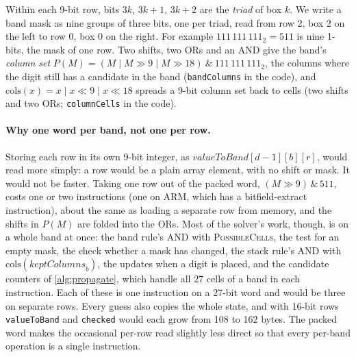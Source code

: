 \documentclass[11pt]{article}
\theoremstyle{definition}
\theoremstyle{plain}
\let\origtextsc\textsc
\renewcommand{\textsc}[1]{\textup{\origtextsc{#1}}}
\begin{document}
\noindent Within each 9-bit row, bits $3k$, $3k{+}1$, $3k{+}2$ are the \emph{triad} of box $k$. We write a band mask as nine groups of three bits, one per triad,
read from row 2, box 2 on the left to row 0, box 0 on the right. For example $111\,111\,111_2 = 511$ is nine 1-bits,
the mask of one row. Two shifts, two ORs
and an AND give the band's \emph{column set} $P(M)=(M \mid M\gg 9 \mid M\gg 18)\ \&\ 111\,111\,111_2$, the columns where the digit still has a
candidate in the band (\texttt{bandColumns} in the code), and $\mathrm{cols}(x)=x \mid x\ll 9 \mid x\ll 18$ spreads a 9-bit column
set back to cells (two shifts and two ORs; \texttt{columnCells} in the code).

\paragraph{Why one word per band, not one per row.} Storing each row in its own 9-bit integer, as
$\mathit{valueToBand}[d-1][b][r]$, would read more simply: a row would be a plain array element, with no shift or mask. It
would not be faster. Taking one row out of the packed word, $(M\gg 9)\,\&\,511$, costs one or two instructions (one on
ARM, which has a bitfield-extract instruction), about the same as loading a separate row from memory, and the shifts in
$P(M)$ are folded into the ORs. Most of the solver's work, though, is on a whole band at once: the band rule's AND with
\textsc{PossibleCells}, the test for an empty mask, the check whether a mask has changed, the stack rule's AND with
$\mathrm{cols}(\mathit{keptColumns}_b)$, the updates when a digit is placed, and the candidate counters of \cref{alg:propagate}, which
handle all 27 cells of a band in each instruction. Each of these is one instruction on a 27-bit word and would be three
on separate rows. Every guess also copies the whole state, and with 16-bit rows \texttt{valueToBand} and \texttt{checked}
would each grow from 108 to 162 bytes. The packed word makes the occasional per-row read slightly less direct so that
every per-band operation is a single instruction.
\end{document}
